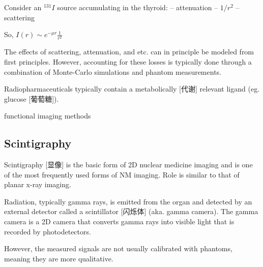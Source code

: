 \documentclass[UTF8,a4paper,11pt]{book}
\theoremstyle{mystyle}{
  \newtheorem{example}{Example}
}
\begin{document}
 Consider an $^{131}I$ source accumulating in the
thyroid:
– attenuation
– $1/r^2$
– scattering

So, $I(r)\sim e^{-\mu r} \frac{1}{r^2}$

The effects of scattering, attenuation, and etc.
can in principle be modeled from first
principles.
 However, accounting for these losses is
typically done through a combination of
Monte-Carlo simulations and phantom
measurements.

Radiopharmaceuticals typically contain a
metabolically [代谢] relevant ligand (eg. glucose [葡萄糖]).

functional imaging methods

\subsection{Scintigraphy}
Scintigraphy [显像] is the basic form of 2D nuclear
medicine imaging and is one of the most
frequently used forms of NM imaging.
Role is similar to that of planar x-ray imaging.

Radiation, typically gamma rays, is emitted
from the organ and detected by an external
detector called a scintillator [闪烁体] (aka. gamma
camera).
 The gamma camera is a 2D camera that
converts gamma rays into visible light that is
recorded by photodetectors.

However, the measured signals are not usually
calibrated with phantoms, meaning they are
more qualitative.
\end{document}
